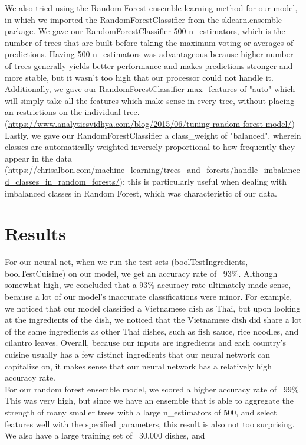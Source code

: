 \documentclass[11pt]{article}
\begin{document}

We also tried using the Random Forest ensemble learning method for our model,
in which we imported the RandomForestClassifier from the sklearn.ensemble package.
We gave our RandomForestClassifier 500 n\_estimators, which is the number of trees
that are built before taking the maximum voting or averages of predictions. Having
500 n\_estimators was advantageous because higher number of trees generally yields
better performance and makes predictions stronger and more stable, but it wasn't
too high that our processor could not handle it. Additionally, we gave our
RandomForestClassifier max\_features of "auto" which will simply take all the
features which make sense in every tree, without placing an restrictions on
the individual tree. (\url{https://www.analyticsvidhya.com/blog/2015/06/tuning-random-forest-model/})
Lastly, we gave our RandomForestClassifier a class\_weight of "balanced", wherein
classes are automatically weighted inversely proportional to how frequently they
appear in the data (\url{https://chrisalbon.com/machine_learning/trees_and_forests/handle_imbalanced_classes_in_random_forests/});
this is particularly useful when dealing with imbalanced classes in Random Forest,
which was characteristic of our data.

\section{Results}

For our neural net, when we run the test sets (boolTestIngredients, boolTestCuisine)
on our model, we get an accuracy rate of ~93\%. Although somewhat high, we
concluded that a 93\% accuracy rate ultimately made sense, because a lot of our
model's inaccurate classifications were minor. For example, we noticed that
our model classified a Vietnamese dish as Thai, but upon looking at the ingredients
of the dish, we noticed that the Vietnamese dish did share a lot of the same
ingredients as other Thai dishes, such as fish sauce, rice noodles, and cilantro
leaves. Overall, because our inputs are ingredients and each country's cuisine usually
has a few distinct ingredients that our neural network can capitalize on,
it makes sense that our neural network has a relatively high accuracy rate. \\

For our random forest ensemble model, we scored a higher accuracy rate of ~99\%.
This was very high, but since we have an ensemble that is able to aggregate
the strength of many smaller trees with a large n\_estimators of 500, and select
features well with the specified parameters, this result is also not too surprising.
We also have a large training set of ~30,000 dishes, and
\end{document}
